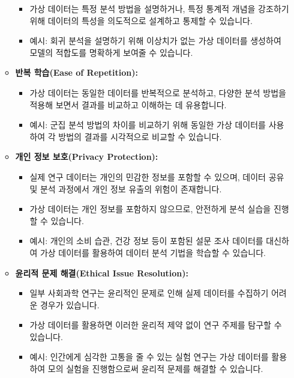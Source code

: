\documentclass[
  letterpaper,
]{book}
\providecommand{\tightlist}{%
  \setlength{\itemsep}{0pt}\setlength{\parskip}{0pt}}
\begin{document}
\begin{itemize}
\begin{itemize}
    \begin{itemize}
    \tightlist
    \item
      가상 데이터는 특정 분석 방법을 설명하거나, 특정 통계적 개념을
      강조하기 위해 데이터의 특성을 의도적으로 설계하고 통제할 수
      있습니다.
    \item
      예시: 회귀 분석을 설명하기 위해 이상치가 없는 가상 데이터를
      생성하여 모델의 적합도를 명확하게 보여줄 수 있습니다.
    \end{itemize}
  \item
    \textbf{반복 학습(Ease of Repetition):}

    \begin{itemize}
    \tightlist
    \item
      가상 데이터는 동일한 데이터를 반복적으로 분석하고, 다양한 분석
      방법을 적용해 보면서 결과를 비교하고 이해하는 데 유용합니다.
    \item
      예시: 군집 분석 방법의 차이를 비교하기 위해 동일한 가상 데이터를
      사용하여 각 방법의 결과를 시각적으로 비교할 수 있습니다.
    \end{itemize}
  \item
    \textbf{개인 정보 보호(Privacy Protection):}

    \begin{itemize}
    \tightlist
    \item
      실제 연구 데이터는 개인의 민감한 정보를 포함할 수 있으며, 데이터
      공유 및 분석 과정에서 개인 정보 유출의 위험이 존재합니다.
    \item
      가상 데이터는 개인 정보를 포함하지 않으므로, 안전하게 분석 실습을
      진행할 수 있습니다.
    \item
      예시: 개인의 소비 습관, 건강 정보 등이 포함된 설문 조사 데이터를
      대신하여 가상 데이터를 활용하여 데이터 분석 기법을 학습할 수
      있습니다.
    \end{itemize}
  \item
    \textbf{윤리적 문제 해결(Ethical Issue Resolution):}

    \begin{itemize}
    \tightlist
    \item
      일부 사회과학 연구는 윤리적인 문제로 인해 실제 데이터를 수집하기
      어려운 경우가 있습니다.
    \item
      가상 데이터를 활용하면 이러한 윤리적 제약 없이 연구 주제를 탐구할
      수 있습니다.
    \item
      예시: 인간에게 심각한 고통을 줄 수 있는 실험 연구는 가상 데이터를
      활용하여 모의 실험을 진행함으로써 윤리적 문제를 해결할 수
      있습니다.
    \end{itemize}
  \end{itemize}
\end{itemize}
\end{document}
